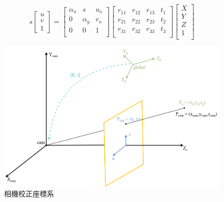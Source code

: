 \begin{equation}
   s
   \begin{bmatrix}
      u \\ v \\ 1
   \end{bmatrix}
   =
   \begin{bmatrix}
      \alpha_x & s & u_o \\
      0 & \alpha_y & v_o \\
      0 & 0 & 1 \\
   \end{bmatrix}
   \begin{bmatrix}
      r_{11} & r_{12} & r_{13} & t_{1} \\
      r_{21} & r_{22} & r_{23} & t_{2} \\
      r_{31} & r_{32} & r_{33} & t_{3} \\
   \end{bmatrix}
   \begin{bmatrix}
      X \\
      Y \\
      Z \\
      1 \\
   \end{bmatrix}
   \label{ch3_equ_camera_calibration}
\end{equation}

\begin{figure}[!ht]
   \centering
   \includegraphics[width=\linewidth]{figure/ch3_fig_camera_calibration.png}
    \caption[相機校正座標系~\cite{dehkharghani2014geometric}]{相機校正座標系~\cite{dehkharghani2014geometric}}
    \label{ch3_fig_camera_calibration}
\end{figure}

